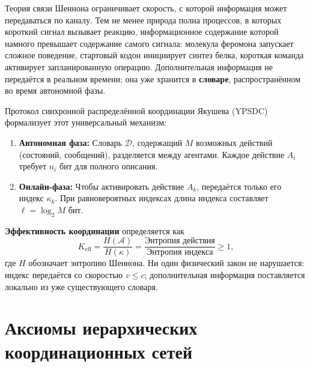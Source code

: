 \documentclass[11pt,a4paper]{article}
\begin{document}
	Теория связи Шеннона ограничивает скорость, с которой информация может передаваться по каналу.  Тем не менее природа полна процессов, в которых короткий сигнал вызывает реакцию, информационное содержание которой намного превышает содержание самого сигнала: молекула феромона запускает сложное поведение, стартовый кодон инициирует синтез белка, короткая команда активирует запланированную операцию.  Дополнительная информация не передаётся в реальном времени; она уже хранится в \textbf{словаре}, распространённом во время автономной фазы.
	
	Протокол синхронной распределённой координации Якушева (YPSDC) формализует этот универсальный механизм:
	\begin{enumerate}[label=(\roman*)]
		\item \textbf{Автономная фаза:} Словарь \(\mathcal{D}\), содержащий \(M\) возможных действий (состояний, сообщений), разделяется между агентами.  Каждое действие \(A_i\) требует \(n_i\) бит для полного описания.
		\item \textbf{Онлайн-фаза:} Чтобы активировать действие \(A_k\), передаётся только его индекс \(\kappa_k\).  При равновероятных индексах длина индекса составляет \(\ell = \log_2 M\) бит.
	\end{enumerate}
	\textbf{Эффективность координации} определяется как
	\begin{equation}
		\boxed{K_{\mathrm{eff}} = \frac{H(\mathcal{A})}{H(\kappa)} = \frac{\text{Энтропия действия}}{\text{Энтропия индекса}} \ge 1},
		\label{eq:keff-def}
	\end{equation}
	где \(H\) обозначает энтропию Шеннона.  Ни один физический закон не нарушается: индекс передаётся со скоростью \(v \le c\); дополнительная информация поставляется локально из уже существующего словаря.
	
	\begin{center}
	\end{center}
	
	\section{Аксиомы иерархических координационных сетей}
	
\end{document}
